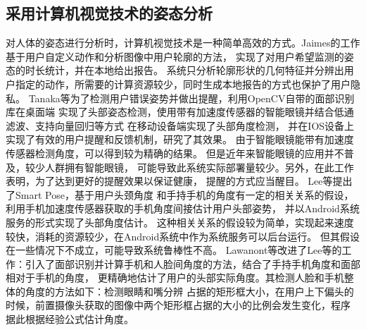 \documentclass[12pt,a4paper]{article}%
\begin{document}
\subsection{采用计算机视觉技术的姿态分析}
对人体的姿态进行分析时，计算机视觉技术是一种简单高效的方式。Jaimes的工作基于用户自定义动作和分析图像中用户轮廓的方法，
实现了对用户希望监测的姿态的时长统计，并在本地给出报告\cite{jaimes2005sit}。
系统只分析轮廓形状的几何特征并分辨出用户指定的动作，所需要的计算资源较少，同时生成本地报告的方式也保护了用户隐私。
Tanaka等为了检测用户错误姿势并做出提醒，利用OpenCV自带的面部识别库在桌面端
实现了头部姿态检测，使用带有加速度传感器的智能眼镜并结合低通滤波、支持向量回归等方式
在移动设备端实现了头部角度检测，
并在IOS设备上实现了有效的用户提醒和反馈机制，研究了其效果\cite{tanaka2015nekoze}。
由于智能眼镜能带有加速度传感器检测角度，可以得到较为精确的结果。
但是近年来智能眼镜的应用并不普及，较少人群拥有智能眼镜，
可能导致此系统实际部署量较少。另外，在此工作表明，为了达到更好的提醒效果以保证健康，
提醒的方式应当醒目。
Lee等提出了Smart Pose，基于用户头颈角度
和手持手机的角度有一定的相关关系的假设，利用手机加速度传感器获取的手机角度间接估计用户头部姿势，
并以Android系统服务的形式实现了头部角度估计\cite{lee2013smart}。
这种相关关系的假设较为简单，实现起来速度较快，消耗的资源较少，在Android系统中作为系统服务可以后台运行。
但其假设在一些情况下不成立，可能导致系统鲁棒性不高。
Lawanont等改进了Lee等的工作：引入了面部识别并计算手机和人脸间角度的方法，结合了手持手机角度和面部相对于手机的角度，
更精确地估计了用户的头部实际角度\cite{lawanont2015smartphone}。其检测人脸和手机整体的角度的方法如下：检测眼睛和嘴分辨
占据的矩形框大小，在用户上下偏头的时候，前置摄像头获取的图像中两个矩形框占据的大小的比例会发生变化，程序
据此根据经验公式估计角度。
\end{document}
